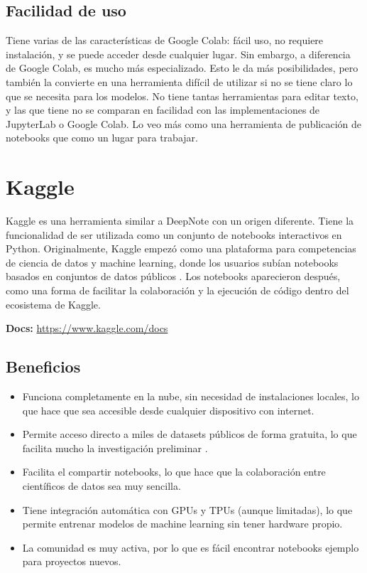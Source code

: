 \documentclass[a4paper,12pt]{article}
\begin{document}
\subsection{Facilidad de uso}
Tiene varias de las características de Google Colab: fácil uso, no requiere instalación, y se puede acceder desde cualquier lugar. Sin embargo, a diferencia de Google Colab, es mucho más especializado. Esto le da más posibilidades, pero también la convierte en una herramienta difícil de utilizar si no se tiene claro lo que se necesita para los modelos.
No tiene tantas herramientas para editar texto, y las que tiene no se comparan en facilidad con las implementaciones de JupyterLab o Google Colab. Lo veo más como una herramienta de publicación de notebooks que como un lugar para trabajar.

\section{Kaggle}
Kaggle es una herramienta similar a DeepNote con un origen diferente. Tiene la funcionalidad de ser utilizada como un conjunto de notebooks interactivos en Python. Originalmente, Kaggle empezó como una plataforma para competencias de ciencia de datos y machine learning, donde los usuarios subían notebooks basados en conjuntos de datos públicos \cite{kaggle_origin}. Los notebooks aparecieron después, como una forma de facilitar la colaboración y la ejecución de código dentro del ecosistema de Kaggle.

\textbf{Docs:} \url{https://www.kaggle.com/docs}\cite{kaggle_docs}

\subsection{Beneficios}
\begin{itemize}
    \item Funciona completamente en la nube, sin necesidad de instalaciones locales, lo que hace que sea accesible desde cualquier dispositivo con internet.
    \item Permite acceso directo a miles de datasets públicos de forma gratuita, lo que facilita mucho la investigación preliminar \cite{kaggle_datasets}.
    \item Facilita el compartir notebooks, lo que hace que la colaboración entre científicos de datos sea muy sencilla.
    \item Tiene integración automática con GPUs y TPUs (aunque limitadas), lo que permite entrenar modelos de machine learning sin tener hardware propio.
    \item La comunidad es muy activa, por lo que es fácil encontrar notebooks ejemplo para proyectos nuevos.
\end{itemize}
\end{document}
